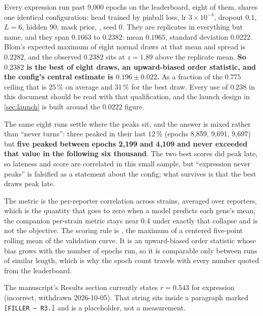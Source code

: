  Every expression run past 9,000 epochs on the leaderboard, eight of them, shares
one identical configuration:  head trained by pinball loss, lr
$3 \times 10^{-4}$, dropout $0.1$,
$L = 6$, hidden 90, mask prior, , seed 0. They are replicates in everything
but name, and they span $0.1663$ to $0.2382$: mean $\mathbf{0.1965}$, standard deviation
$\mathbf{0.0222}$. Blom's expected maximum of eight normal draws at that mean and spread is
$0.2282$, and the observed $0.2382$ sits at $z = 1.89$ above the replicate mean. \textbf{So
$0.2382$ is the best of eight draws, an upward-biased order statistic, and the config's
central estimate is $0.196 \pm 0.022$.} As a fraction of the $0.775$ ceiling that is
$25\,\%$ on average and $31\,\%$ for the best draw. Every use of $0.238$ in this document
should be read with that qualification, and the launch design in \cref{sec:launch} is built
around the $0.0222$ figure.

The same eight runs settle where the peaks sit, and the answer is mixed rather than ``never
turns'': three peaked in their last $12\,\%$ (epochs 8,859, 9,691, 9,697) but \textbf{five
peaked between epochs 2,199 and 4,109 and never exceeded that value in the following six
thousand}. The two best scores did peak late, so lateness and score are correlated in this
small sample, but ``expression never peaks'' is falsified as a statement about the config;
what survives is that the best draws peak late.

The metric is the per-reporter correlation across strains, averaged over reporters, which
is the quantity that goes to zero when a model predicts each gene's mean; the companion
per-strain metric stays near $0.4$ under exactly that collapse and is not the objective.
The scoring rule is , the maximum of a centered five-point rolling mean of
the validation curve. It is an upward-biased order statistic whose bias grows with the
number of epochs run, so it is comparable only between runs of similar length, which is why
the epoch count travels with every number quoted from the leaderboard.

The manuscript's Results section currently states $r = 0.543$ for expression (incorrect, withdrawn 2026-10-05). That string
sits inside a paragraph marked \texttt{[FILLER -- R3.]} and is a placeholder, not a
measurement.

